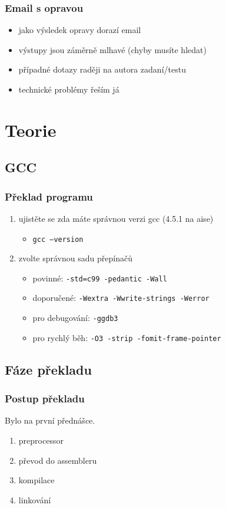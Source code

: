 \begin{frame}
	\frametitle{Email s opravou}
	\begin{itemize}
		\item{jako výsledek opravy dorazí email}
		\item{výstupy jsou záměrně mlhavé (chyby musíte hledat)}
		\item{případné dotazy raději na autora zadaní/testu}
		\item{technické problémy řeším já}
	\end{itemize}
\end{frame}


\section{Teorie}
\subsection{GCC}

\begin{frame}
	\frametitle{Překlad programu}
	\begin{enumerate}
		\item{ujistěte se zda máte správnou verzi gcc (4.5.1 na aise)}
		\begin{itemize}
			\item{\texttt{gcc --version}}
		\end{itemize}
		\item{zvolte správnou sadu přepínačů}
		\begin{itemize}
			\item{\alert{povinné:} \texttt{-std=c99 -pedantic -Wall}}
			\item{\alert{doporučené:} \texttt{-Wextra -Wwrite-strings -Werror}}
			\item{pro debugování: \texttt{-ggdb3}}
			\item{pro rychlý běh: \texttt{-O3 -strip -fomit-frame-pointer}}
		\end{itemize}
	\end{enumerate}
\end{frame}

\subsection{Fáze překladu}

\begin{frame}
	\frametitle{Postup překladu}
	Bylo na první přednášce.
	\begin{enumerate}
		\item{preprocessor}
		\item{převod do assembleru}
		\item{kompilace}
		\item{linkování}
	\end{enumerate}
\end{frame}

